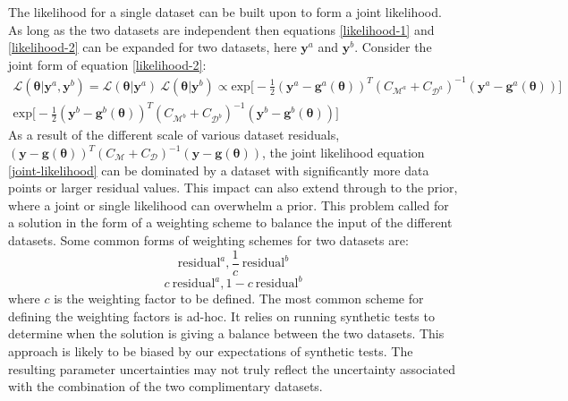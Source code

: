 The likelihood for a single dataset can be built upon to form a joint likelihood. As long as the two datasets are independent then equations \ref{likelihood-1} and \ref{likelihood-2} can be expanded for two datasets, here $\bm{y}^a$ and $\bm{y}^b$. Consider the joint form of equation \ref{likelihood-2}:
\begin{multline}
\mathcal{L}(\bm{\theta}|\bm{y}^a,\bm{y}^b) = \mathcal{L}(\bm{\theta}|\bm{y}^a)\ \mathcal{L}(\bm{\theta}|\bm{y}^b)
\propto \text{exp}\bigg[-\frac{1}{2}(\bm{y}^a-\bm{g}^a(\bm{\theta}))^T(C_{\mathcal{M}^a}+C_{\mathcal{D}^a})^{-1}(\bm{y}^a-\bm{g}^a(\bm{\theta}))\bigg]\ \\
\text{exp}\bigg[-\frac{1}{2}(\bm{y}^b-\bm{g}^b(\bm{\theta}))^T(C_{\mathcal{M}^b}+C_{\mathcal{D}^b})^{-1}(\bm{y}^b-\bm{g}^b(\bm{\theta}))\bigg]
\label{joint-likelihood}
\end{multline}
As a result of the different scale of various dataset residuals, $(\bm{y}-\bm{g}(\bm{\theta}))^T(C_{\mathcal{M}}+C_{\mathcal{D}})^{-1}(\bm{y}-\bm{g}(\bm{\theta}))$, the joint likelihood equation \ref{joint-likelihood} can be  dominated by a dataset with significantly more data points or larger residual values. This impact can also extend through to the prior, where a joint or single likelihood can overwhelm a prior. This problem called for a solution in the form of a weighting scheme to balance the input of the different datasets. Some common forms of weighting schemes for two datasets are:
\begin{equation}
\text{residual}^a, \frac{1}{c}\ \text{residual}^b
\end{equation}
\begin{equation}
c\ \text{residual}^a, 1-c\ \text{residual}^b
\end{equation}
where $c$ is the weighting factor to be defined. The most common scheme for defining the weighting factors is ad-hoc. It relies on running synthetic tests to determine when the solution is giving a balance between the two datasets. This approach is likely to be biased by our expectations of synthetic tests. The resulting parameter uncertainties may not truly reflect the uncertainty associated with the combination of the two complimentary datasets. \par


